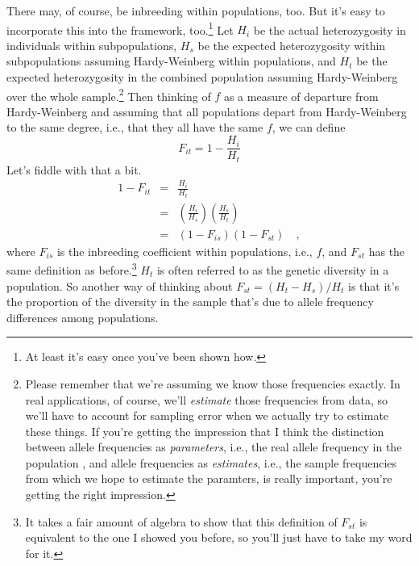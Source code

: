 \documentclass[12pt]{article}
\begin{document}
There may, of course, be inbreeding within populations, too. But it's
easy to incorporate this into the framework, too.\footnote{At least
  it's easy once you've been shown how.} Let $H_i$ be the actual
heterozygosity in individuals within subpopulations, $H_s$ be the
expected heterozygosity within subpopulations assuming Hardy-Weinberg
within populations, and $H_t$ be the expected heterozygosity in the
combined population assuming Hardy-Weinberg over the whole
sample.\footnote{Please remember that we're assuming we know those
  frequencies exactly. In real applications, of course, we'll {\it
    estimate\/} those frequencies from data, so we'll have to account
  for sampling error when we actually try to estimate these things. If
  you're getting the impression that I think the distinction between
  allele frequencies as {\it parameters\/}, i.e., the real allele
  frequency in the population , and allele frequencies as {\it
    estimates\/}, i.e., the sample frequencies from which we hope to
  estimate the paramters, is really important, you're getting the
  right impression.}  Then thinking of $f$ as a measure of departure
from Hardy-Weinberg and assuming that all populations depart from
Hardy-Weinberg to the same degree, i.e., that they all have the same
$f$, we can define
\[
F_{it} = 1 - \frac{H_i}{H_t}
\]
Let's fiddle with that a bit.
\begin{eqnarray*}
1 - F_{it} &=& \frac{H_i}{H_t} \\
           &=& \left(\frac{H_i}{H_s}\right)\left(\frac{H_s}{H_t}\right) \\
           &=& (1 - F_{is})(1 - F_{st}) \quad ,
\end{eqnarray*}
where $F_{is}$ is the inbreeding coefficient within populations, i.e.,
$f$, and $F_{st}$ has the same definition as before.\footnote{It takes
  a fair amount of algebra to show that this definition of $F_{st}$ is
  equivalent to the one I showed you before, so you'll just have to
  take my word for it.} $H_t$ is often referred to as the genetic
diversity in a population. So another way of thinking about $F_{st} =
(H_t - H_s)/H_t$ is that it's the proportion of the diversity in the
sample that's due to allele frequency differences among populations.




\ccLicense
\end{document}
